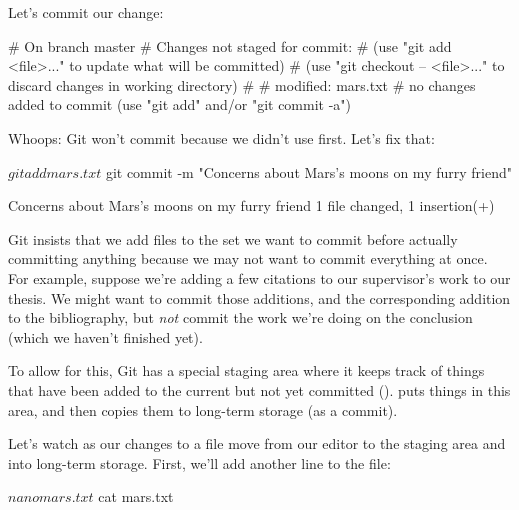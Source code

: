 Let's commit our change:


\begin{VerbOut}
# On branch master
# Changes not staged for commit:
#   (use "git add <file>..." to update what will be committed)
#   (use "git checkout -- <file>..." to discard changes in working directory)
#
#   modified:   mars.txt
#
no changes added to commit (use "git add" and/or "git commit -a")
\end{VerbOut}

Whoops: Git won't commit because we didn't use  first.
Let's fix that:

\begin{VerbIn}
$ git add mars.txt
$ git commit -m "Concerns about Mars's moons on my furry friend"
\end{VerbIn}

\begin{VerbOut}
[master 34961b1] Concerns about Mars's moons on my furry friend
 1 file changed, 1 insertion(+)
\end{VerbOut}

Git insists that we add files to the set we want to commit before
actually committing anything because we may not want to commit
everything at once. For example, suppose we're adding a few citations to
our supervisor's work to our thesis. We might want to commit those
additions, and the corresponding addition to the bibliography, but
\emph{not} commit the work we're doing on the conclusion (which we
haven't finished yet).

To allow for this, Git has a special staging area where it keeps track
of things that have been added to the current
 but not yet committed ().
 puts things in this area, and  then
copies them to long-term storage (as a commit).


Let's watch as our changes to a file move from our editor to the staging
area and into long-term storage. First, we'll add another line to the
file:

\begin{VerbIn}
$ nano mars.txt
$ cat mars.txt
\end{VerbIn}

